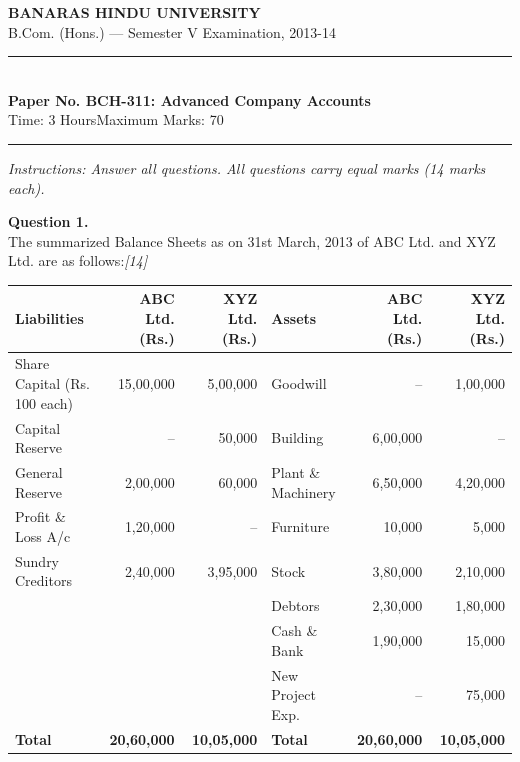 \documentclass[11pt,a4paper]{article}
\newcommand{\pts}[1]{\hfill   \textit{[#1]}}
\begin{document}
\begin{center}
  {\large\bfseries BANARAS HINDU UNIVERSITY}\\[2pt]
  {\normalsize B.Com. (Hons.) --- Semester V Examination, 2013-14}\\[6pt]
  \rule{0.8\linewidth}{0.5pt}\\[6pt]
  {\large\bfseries Paper No. BCH-311: Advanced Company Accounts}\\[4pt]
  {\normalsize Time: 3 Hours\hfill Maximum Marks: 70}
\end{center}

\rule{\linewidth}{0.4pt}

\smallskip



\noindent   \textit{Instructions: Answer all questions. All questions carry equal marks (14 marks each).}

\bigskip




\noindent   \textbf{Question 1.} \\
The summarized Balance Sheets as on 31st March, 2013 of ABC Ltd. and XYZ Ltd. are as follows:\pts{14}

\begin{center}
\small
\renewcommand{\arraystretch}{1.2}

\begin{tabular}{|l|r|r|l|r|r|}
\hline
   \textbf{Liabilities} &   \textbf{ABC Ltd. (Rs.)} &   \textbf{XYZ Ltd. (Rs.)} &   \textbf{Assets} &   \textbf{ABC Ltd. (Rs.)} &   \textbf{XYZ Ltd. (Rs.)} \\ \hline
Share Capital (Rs. 100 each) & 15,00,000 & 5,00,000 & Goodwill & -- & 1,00,000 \\
Capital Reserve & -- & 50,000 & Building & 6,00,000 & -- \\
General Reserve & 2,00,000 & 60,000 & Plant \& Machinery & 6,50,000 & 4,20,000 \\
Profit \& Loss A/c & 1,20,000 & -- & Furniture & 10,000 & 5,000 \\
Sundry Creditors & 2,40,000 & 3,95,000 & Stock & 3,80,000 & 2,10,000 \\
& & & Debtors & 2,30,000 & 1,80,000 \\
& & & Cash \& Bank & 1,90,000 & 15,000 \\
& & & New Project Exp. & -- & 75,000 \\ \hline
   \textbf{Total} &   \textbf{20,60,000} &   \textbf{10,05,000} &   \textbf{Total} &   \textbf{20,60,000} &   \textbf{10,05,000} \\ \hline
\end{tabular}
\end{center}
\end{document}
